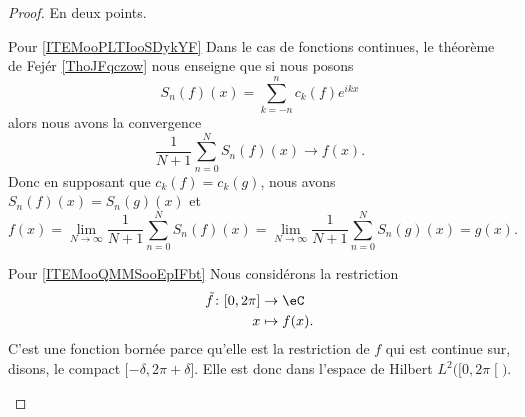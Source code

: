 \begin{proof}
	En deux points.
	\begin{subproof}
		\item[Pour \ref{ITEMooPLTIooSDykYF}]
		Dans le cas de fonctions continues, le théorème de Fejér \ref{ThoJFqczow} nous enseigne que si nous posons
		\begin{equation}
			S_n(f)(x)=\sum_{k=-n}^{n}c_k(f) e^{ikx}
		\end{equation}
		alors nous avons la convergence
		\begin{equation}
			\frac{1}{ N+1 }\sum_{n=0}^NS_n(f)(x)\to f(x).
		\end{equation}
		Donc en supposant que \( c_k(f)=c_k(g)\), nous avons \( S_n(f)(x)=S_n(g)(x)\) et
		\begin{equation}
			f(x)=\lim_{N\to \infty} \frac{1}{ N+1 }\sum_{n=0}^NS_n(f)(x)=\lim_{N\to \infty} \frac{1}{ N+1 }\sum_{n=0}^NS_n(g)(x)=g(x).
		\end{equation}
		\item[Pour \ref{ITEMooQMMSooEpIFbt}]
		Nous considérons la restriction
		\begin{equation}
			\begin{aligned}
				\tilde f\colon \mathopen[ 0 , 2\pi \mathclose] & \to \eC       \\
				x                                              & \mapsto f(x).
			\end{aligned}
		\end{equation}
		C'est une fonction bornée parce qu'elle est la restriction de \( f\) qui est continue sur, disons, le compact \( \mathopen[ -\delta , 2\pi+\delta \mathclose]\). Elle est donc dans l'espace de Hilbert \( L^2\big( \mathopen[ 0 , 2\pi \mathclose[ \big)\).


\end{subproof}
\end{proof}
